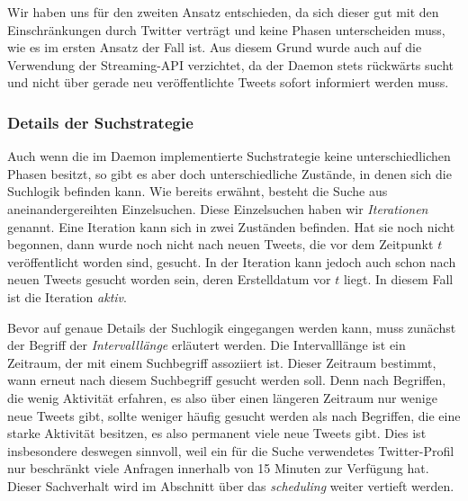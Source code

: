 Wir haben uns für den zweiten Ansatz entschieden, da sich dieser gut mit den Einschränkungen durch Twitter verträgt und keine Phasen unterscheiden muss, wie es im ersten Ansatz der Fall ist.
Aus diesem Grund wurde auch auf die Verwendung der Streaming-API verzichtet, da der Daemon stets rückwärts sucht und nicht über gerade neu veröffentlichte Tweets sofort informiert werden muss.

\subsubsection{Details der Suchstrategie}

Auch wenn die im Daemon implementierte Suchstrategie keine unterschiedlichen Phasen besitzt, so gibt es aber doch unterschiedliche Zustände, in denen sich die Suchlogik befinden kann.
Wie bereits erwähnt, besteht die Suche aus aneinandergereihten Einzelsuchen.
Diese Einzelsuchen haben wir \emph{Iterationen} genannt.
Eine Iteration kann sich in zwei Zuständen befinden.
Hat sie noch nicht begonnen, dann wurde noch nicht nach neuen Tweets, die vor dem Zeitpunkt $t$ veröffentlicht worden sind, gesucht.
In der Iteration kann jedoch auch schon nach neuen Tweets gesucht worden sein, deren Erstelldatum vor $t$ liegt.
In diesem Fall ist die Iteration \emph{aktiv}. 

Bevor auf genaue Details der Suchlogik eingegangen werden kann, muss zunächst der Begriff der \emph{Intervalllänge} erläutert werden.
Die Intervalllänge ist ein Zeitraum, der mit einem Suchbegriff assoziiert ist.
Dieser Zeitraum bestimmt, wann erneut nach diesem Suchbegriff gesucht werden soll.
Denn nach Begriffen, die wenig Aktivität erfahren, es also über einen längeren Zeitraum nur wenige neue Tweets gibt, sollte weniger häufig gesucht werden als nach Begriffen, die eine starke Aktivität besitzen, es also permanent viele neue Tweets gibt.
Dies ist insbesondere deswegen sinnvoll, weil ein für die Suche verwendetes Twitter-Profil nur beschränkt viele Anfragen innerhalb von 15 Minuten zur Verfügung hat.
Dieser Sachverhalt wird im Abschnitt über das \textit{scheduling} weiter vertieft werden.

